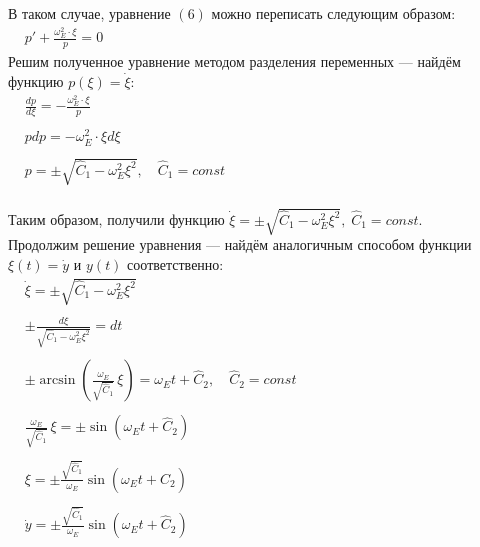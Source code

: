 \documentclass[oneside,final,14pt]{extarticle}
\begin{document}
		\noindent В таком случае, уравнение $(6)$ можно переписать следующим образом: \\
		
		\begin{math}
			\begin{aligned}
				& p' + \frac{\omega_{E}^{2} \cdot \xi}{p} = 0
			\end{aligned}
		\end{math} \\
		
		\noindent Решим полученное уравнение методом разделения переменных --- найдём функцию $p(\xi) = \dot{\xi}$: \\
		
		\begin{math}
			\begin{aligned}
				& \frac{dp}{d\xi} = - \frac{\omega_{E}^{2} \cdot \xi}{p} \\\\
				& pdp = - \omega_{E}^{2} \cdot \xi d\xi \\\\
				& p = \pm \sqrt{\widehat{C}_{1} - \omega_{E}^{2} \xi^{2}}, \quad \widehat{C}_{1} = const
			\end{aligned}
		\end{math} \\\\
		
		\noindent Таким образом, получили функцию $\dot{\xi} = \pm \sqrt{\widehat{C}_{1} - \omega_{E}^{2} \xi^{2}},\; \widehat{C}_{1} = const$. \\
		
		\noindent Продолжим решение уравнения --- найдём аналогичным способом функции $\xi(t) = \dot{y}$ и $y(t)$ соответственно: \\
		
		\begin{math}
			\begin{aligned}
				& \dot{\xi} = \pm \sqrt{\widehat{C}_{1} - \omega_{E}^{2} \xi^{2}} \\\\
				& \pm \frac{d\xi}{\sqrt{\widehat{C}_{1} - \omega_{E}^{2} \xi^{2}}} = dt \\\\
				& \pm \arcsin{\left(\frac{\omega_{E}}{\sqrt{\widehat{C}_{1}}}\,\xi\right)} = \omega_{E}t + \widehat{C}_{2}, \quad \widehat{C}_{2} = const  \\\\
				& \frac{\omega_{E}}{\sqrt{\widehat{C}_{1}}}\,\xi = \pm \sin{(\omega_{E}t + \widehat{C}_{2})} \\\\
				& \xi = \pm \frac{\sqrt{\widehat{C}_1}}{\omega_{E}} \sin{(\omega_{E}t + \widehat{C}_{2})} \\\\
				& \dot{y} = \pm \frac{\sqrt{\widehat{C}_1}}{\omega_{E}} \sin{(\omega_{E}t + \widehat{C}_{2})} \\\\
			\end{aligned}
		\end{math}
		
\end{document}
